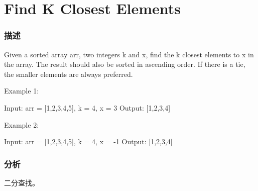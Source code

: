 \section{Find K Closest Elements} %
\label{sec:find-k-closest-elements}


\subsubsection{描述}
Given a sorted array arr, two integers k and x, find the k closest elements to x in the array. The result should also be sorted in ascending order. If there is a tie, the smaller elements are always preferred.

Example 1:
\begin{Code}
Input: arr = [1,2,3,4,5], k = 4, x = 3
Output: [1,2,3,4]
\end{Code}

Example 2:
\begin{Code}
Input: arr = [1,2,3,4,5], k = 4, x = -1
Output: [1,2,3,4]
\end{Code}

\subsubsection{分析}
二分查找。


